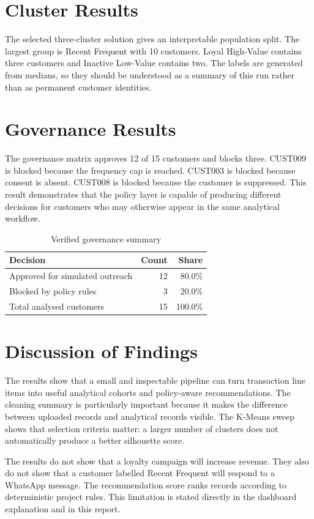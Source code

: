 \documentclass[12pt,a4paper]{report}
\begin{document}
\section{Cluster Results}
The selected three-cluster solution gives an interpretable population split. The largest group is Recent Frequent with 10 customers. Loyal High-Value contains three customers and Inactive Low-Value contains two. The labels are generated from medians, so they should be understood as a summary of this run rather than as permanent customer identities.

\section{Governance Results}
The governance matrix approves 12 of 15 customers and blocks three. CUST009 is blocked because the frequency cap is reached. CUST003 is blocked because consent is absent. CUST008 is blocked because the customer is suppressed. This result demonstrates that the policy layer is capable of producing different decisions for customers who may otherwise appear in the same analytical workflow.

\begin{table}[H]
\centering
\caption{Verified governance summary}\label{tab:governance}
\begin{tabular}{p{}r r}
\toprule
Decision & Count & Share\\\midrule
Approved for simulated outreach & 12 & 80.0\%\\
Blocked by policy rules & 3 & 20.0\%\\
Total analysed customers & 15 & 100.0\%\\\bottomrule
\end{tabular}
\end{table}

\section{Discussion of Findings}
The results show that a small and inspectable pipeline can turn transaction line items into useful analytical cohorts and policy-aware recommendations. The cleaning summary is particularly important because it makes the difference between uploaded records and analytical records visible. The K-Means sweep shows that selection criteria matter: a larger number of clusters does not automatically produce a better silhouette score.

The results do not show that a loyalty campaign will increase revenue. They also do not show that a customer labelled Recent Frequent will respond to a WhatsApp message. The recommendation score ranks records according to deterministic project rules. This limitation is stated directly in the dashboard explanation and in this report.
\end{document}
